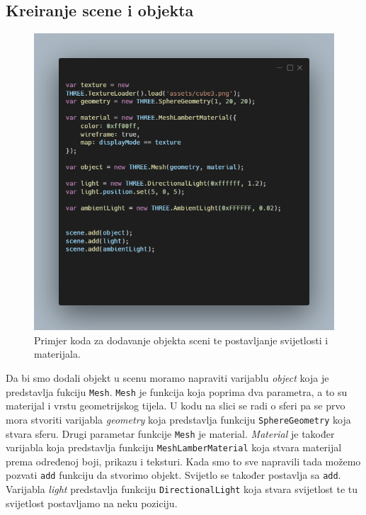 \documentclass[a4paper,12pt]{article}
\begin{document}
\subsection*{Kreiranje scene i objekta}
\begin{figure}[ht]
    \centering
    \includegraphics[scale=0.5]{image/zadatak1_objekti.png}
    \caption{Primjer koda za dodavanje objekta sceni te postavljanje svijetlosti i materijala.}
\end{figure}


Da bi smo dodali objekt u scenu moramo napraviti varijablu \textit{object} koja je predstavlja fukciju \texttt{Mesh}. \texttt{Mesh} je funkcija koja poprima dva parametra, a to su materijal i 
vrstu geometrijskog tijela. U kodu na slici se radi o sferi pa se prvo mora stvoriti varijabla \textit{geometry} koja predstavlja funkciju \texttt{SphereGeometry} koja stvara sferu.
Drugi parametar funkcije \texttt{Mesh} je material. \textit{Material} je također varijabla koja predstavlja funkciju \texttt{MeshLamberMaterial} koja stvara materijal prema određenoj boji, 
prikazu i teksturi. Kada smo to sve napravili tada možemo pozvati \texttt{add} funkciju da stvorimo objekt. Svijetlo  se također postavlja sa \texttt{add}.
Varijabla \textit{light} predstavlja funkciju \texttt{DirectionalLight} koja stvara svijetlost te tu svijetlost postavljamo na neku poziciju. 
\pagebreak
\end{document}
